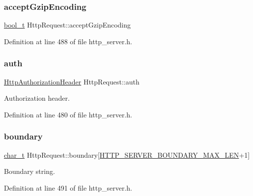 \subsubsection{\texorpdfstring{accept\+Gzip\+Encoding}{acceptGzipEncoding}}
{\footnotesize\ttfamily \hyperlink{compiler__port_8h_a812d16e5494522586b3784e55d479912}{bool\+\_\+t} Http\+Request\+::accept\+Gzip\+Encoding}



Definition at line 488 of file http\+\_\+server.\+h.

\mbox{\label{structHttpRequest_a133573b21cfeec11680e82cce5d2c551}} 
\subsubsection{\texorpdfstring{auth}{auth}}
{\footnotesize\ttfamily \hyperlink{structHttpAuthorizationHeader}{Http\+Authorization\+Header} Http\+Request\+::auth}



Authorization header. 



Definition at line 480 of file http\+\_\+server.\+h.

\mbox{\label{structHttpRequest_a4c8fdacc57d38db41fd0006662b75fb9}} 
\subsubsection{\texorpdfstring{boundary}{boundary}}
{\footnotesize\ttfamily \hyperlink{compiler__port_8h_a40bb5262bf908c328fbcfbe5d29d0201}{char\+\_\+t} Http\+Request\+::boundary\mbox{[}\hyperlink{http__server_8h_a1ecbcd512cdc74212d1ab9c4c8c8edde}{H\+T\+T\+P\+\_\+\+S\+E\+R\+V\+E\+R\+\_\+\+B\+O\+U\+N\+D\+A\+R\+Y\+\_\+\+M\+A\+X\+\_\+\+L\+EN}+1\mbox{]}}



Boundary string. 



Definition at line 491 of file http\+\_\+server.\+h.

\mbox{\label{structHttpRequest_aa8e24c0fb310c7b008bf6379601ac1da}} 
